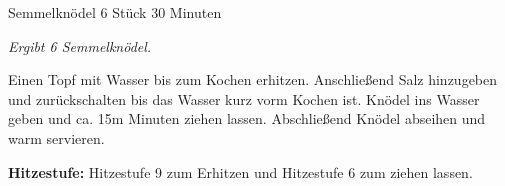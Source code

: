 \begin{recipe}{Semmelknödel} {6 Stück} {30 Minuten}

  \freeform
  \textit{Ergibt 6 Semmelknödel.}


  

  \newstep
  Einen Topf mit Wasser bis zum Kochen erhitzen.
  Anschließend Salz hinzugeben und zurückschalten bis das Wasser kurz vorm Kochen ist.
  Knödel ins Wasser geben und ca. 15m Minuten ziehen lassen.
  Abschließend Knödel abseihen und warm servieren. 

  \freeform
  \hrulefill

  \freeform
  \textbf{Hitzestufe:}
  Hitzestufe 9 zum Erhitzen und Hitzestufe 6 zum ziehen lassen.

\end{recipe}
